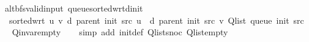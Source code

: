 \begin{isabellebody}
{}
\isamarkuptrue%
%
\endisatagdocument
{\isafolddocument}%
%
\isadelimdocument
%
\endisadelimdocument
{}\isamarkupfalse%
\ {\isacharparenleft}{\kern0pt}\ alt{\isacharunderscore}{\kern0pt}bfs{\isacharunderscore}{\kern0pt}valid{\isacharunderscore}{\kern0pt}input{\isacharparenright}{\kern0pt}\ queue{\isacharunderscore}{\kern0pt}sorted{\isacharunderscore}{\kern0pt}wrt{\isacharunderscore}{\kern0pt}d{\isacharunderscore}{\kern0pt}init{\isacharcolon}{\kern0pt}\isanewline
\ \ \ {\isachardoublequoteopen}sorted{\isacharunderscore}{\kern0pt}wrt\ {\isacharparenleft}{\kern0pt}{\isasymlambda}u\ v{\isachardot}{\kern0pt}\ d\ {\isacharparenleft}{\kern0pt}parent\ {\isacharparenleft}{\kern0pt}init\ src{\isacharparenright}{\kern0pt}{\isacharparenright}{\kern0pt}\ u\ {\isasymle}\ d\ {\isacharparenleft}{\kern0pt}parent\ {\isacharparenleft}{\kern0pt}init\ src{\isacharparenright}{\kern0pt}{\isacharparenright}{\kern0pt}\ v{\isacharparenright}{\kern0pt}\ {\isacharparenleft}{\kern0pt}Q{\isacharunderscore}{\kern0pt}list\ {\isacharparenleft}{\kern0pt}queue\ {\isacharparenleft}{\kern0pt}init\ src{\isacharparenright}{\kern0pt}{\isacharparenright}{\kern0pt}{\isacharparenright}{\kern0pt}{\isachardoublequoteclose}\isanewline
%
\isadelimproof
\ \ %
\endisadelimproof
%
\isatagproof
{}\isamarkupfalse%
\ Q{\isachardot}{\kern0pt}invar{\isacharunderscore}{\kern0pt}empty\isanewline
\ \ \isamarkupfalse%
\ {\isacharparenleft}{\kern0pt}simp\ add{\isacharcolon}{\kern0pt}\ init{\isacharunderscore}{\kern0pt}def\ Q{\isachardot}{\kern0pt}list{\isacharunderscore}{\kern0pt}snoc\ Q{\isachardot}{\kern0pt}list{\isacharunderscore}{\kern0pt}empty{\isacharparenright}{\kern0pt}%
\endisatagproof
{\isafoldproof}%
%
\isadelimproof
%
\endisadelimproof
%
\isadelimdocument
%
\endisadelimdocument
%
\isatagdocument
%

\end{isabellebody}
